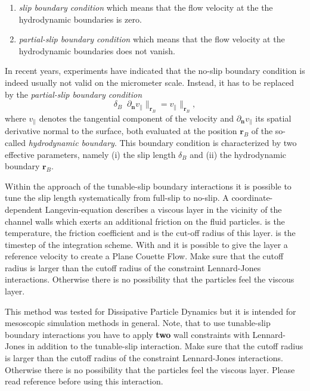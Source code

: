 \begin{enumerate} 
\item \emph{slip boundary condition} which means that the flow
  velocity at the the hydrodynamic boundaries is zero.
\item \emph{partial-slip boundary condition} which means that the flow 
  velocity at the hydrodynamic boundaries does not vanish.
\end{enumerate}

In recent years, experiments have indicated that the no-slip boundary
condition is indeed usually not valid on the micrometer
scale. Instead, it has to be replaced by the \emph{partial-slip
  boundary condition}
\begin{displaymath}
\delta_B \; \; \partial_\mathbf{n} v_{\parallel} \rVert_{\mathbf{r}_B} =
v_{\parallel} \rVert_{\mathbf{r}_B},
\end{displaymath}
where $v_{\parallel}$ denotes the tangential component of the velocity
and $\partial_\mathbf{n} v_{\parallel}$ its spatial derivative normal
to the surface, both evaluated at the position $\mathbf{r}_B$ of the
so-called \emph{hydrodynamic boundary}.  This boundary condition is
characterized by two effective parameters, namely (i) the slip length
$\delta_B$ and (ii) the hydrodynamic boundary $\mathbf{r}_B$.

Within the approach of the tunable-slip boundary interactions it is
possible to tune the slip length systematically from full-slip to
no-slip.  A coordinate-dependent Langevin-equation describes a viscous
layer in the vicinity of the channel walls which exerts an additional
friction on the fluid particles.   is the temperature,
 the friction coefficient and  is
the cut-off radius of this layer.  is the timestep of
the integration scheme. With   and  it is
possible to give the layer a reference velocity to create a Plane
Couette Flow.  Make sure that the cutoff radius 
is larger than the cutoff radius of the constraint Lennard-Jones
interactions. Otherwise there is no possibility that the particles
feel the viscous layer.

This method was tested for Dissipative Particle Dynamics but it is
intended for mesoscopic simulation methods in general. Note, that to
use tunable-slip boundary interactions you have to apply \textbf{two}
wall constraints with Lennard-Jones in addition to the
tunable-slip interaction. Make sure that the cutoff radius
 is larger than the cutoff radius of the
constraint Lennard-Jones interactions. Otherwise there is no
possibility that the particles feel the viscous layer.  Please read
reference \cite{smiatek08a} before using this interaction.

